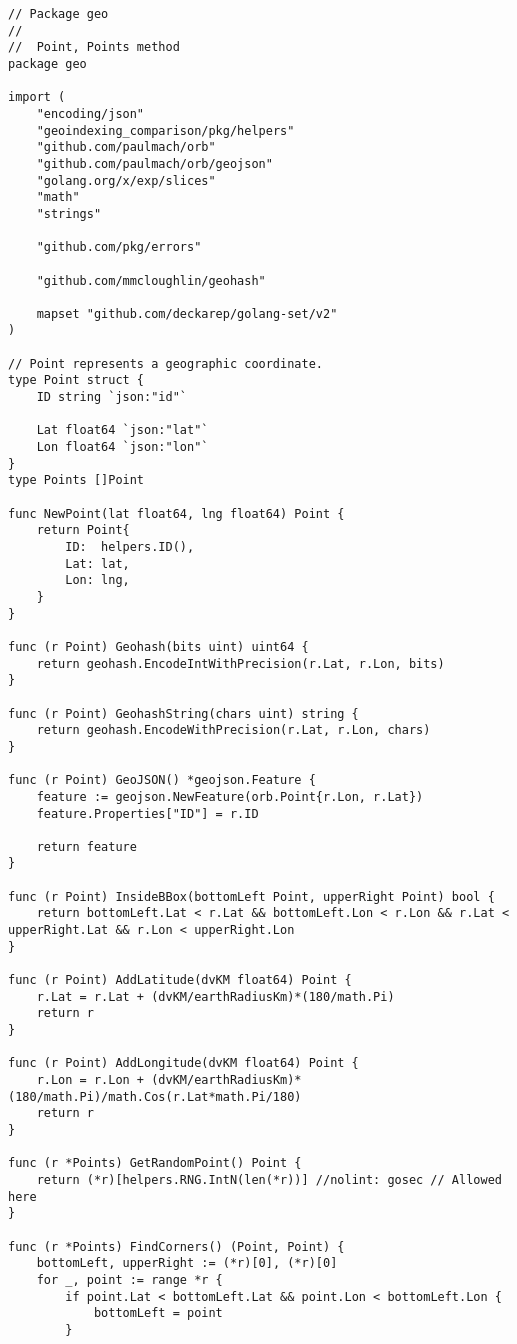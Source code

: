     
\begin{lstlisting}[caption=points.go]
// Package geo
//
//	Point, Points method
package geo

import (
	"encoding/json"
	"geoindexing_comparison/pkg/helpers"
	"github.com/paulmach/orb"
	"github.com/paulmach/orb/geojson"
	"golang.org/x/exp/slices"
	"math"
	"strings"

	"github.com/pkg/errors"

	"github.com/mmcloughlin/geohash"

	mapset "github.com/deckarep/golang-set/v2"
)

// Point represents a geographic coordinate.
type Point struct {
	ID string `json:"id"`

	Lat float64 `json:"lat"`
	Lon float64 `json:"lon"`
}
type Points []Point

func NewPoint(lat float64, lng float64) Point {
	return Point{
		ID:  helpers.ID(),
		Lat: lat,
		Lon: lng,
	}
}

func (r Point) Geohash(bits uint) uint64 {
	return geohash.EncodeIntWithPrecision(r.Lat, r.Lon, bits)
}

func (r Point) GeohashString(chars uint) string {
	return geohash.EncodeWithPrecision(r.Lat, r.Lon, chars)
}

func (r Point) GeoJSON() *geojson.Feature {
	feature := geojson.NewFeature(orb.Point{r.Lon, r.Lat})
	feature.Properties["ID"] = r.ID

	return feature
}

func (r Point) InsideBBox(bottomLeft Point, upperRight Point) bool {
	return bottomLeft.Lat < r.Lat && bottomLeft.Lon < r.Lon && r.Lat < upperRight.Lat && r.Lon < upperRight.Lon
}

func (r Point) AddLatitude(dvKM float64) Point {
	r.Lat = r.Lat + (dvKM/earthRadiusKm)*(180/math.Pi)
	return r
}

func (r Point) AddLongitude(dvKM float64) Point {
	r.Lon = r.Lon + (dvKM/earthRadiusKm)*(180/math.Pi)/math.Cos(r.Lat*math.Pi/180)
	return r
}

func (r *Points) GetRandomPoint() Point {
	return (*r)[helpers.RNG.IntN(len(*r))] //nolint: gosec // Allowed here
}

func (r *Points) FindCorners() (Point, Point) {
	bottomLeft, upperRight := (*r)[0], (*r)[0]
	for _, point := range *r {
		if point.Lat < bottomLeft.Lat && point.Lon < bottomLeft.Lon {
			bottomLeft = point
		}


\end{lstlisting}
